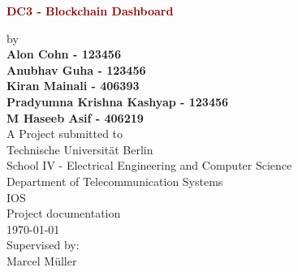 \begin{titlepage}
	\strut
	\hfill
	\begin{center}
	\vspace{1cm}
		\Huge
		\begin{spacing}{.9}
			\textcolor{DarkRed}{\textbf{DC3 - Blockchain Dashboard}}\\
		\end{spacing}
		\vspace{0.8cm}
		\large
		by\\
		\vspace{0.8cm}
		\textbf{Alon Cohn - 123456}\\
		\textbf{Anubhav Guha - 123456}\\
		\textbf{Kiran Mainali - 406393}\\
		\textbf{Pradyumna Krishna Kashyap - 123456}\\
		\textbf{M Haseeb Asif - 406219}\\
		\vspace{0.8cm}
		\vspace{2cm}
	 	A Project submitted to\\
		\vspace{0.5cm}
		Technische Universität Berlin\\
		School IV - Electrical Engineering and Computer Science\\
		Department of Telecommunication Systems\\
		IOS\\
		\vspace{0.5cm}
		Project documentation\\
		\vspace{2.2cm}
		\today\\
		\vspace{2.0cm}
		\large
		Supervised by:\\
    	Marcel Müller\\
		\vspace{1cm}
		\end{center}
\end{titlepage}

\shipout\null
\shipout\null